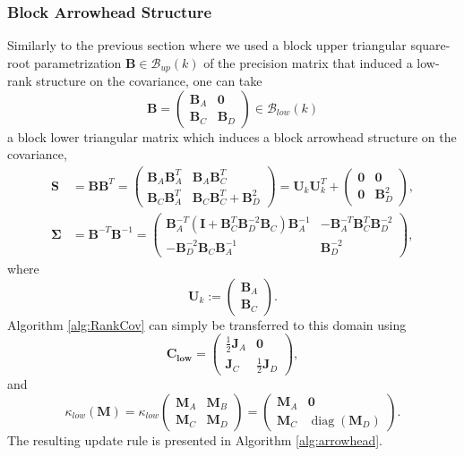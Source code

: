 \documentclass[a4paper, 11pt, oneside]{scrartcl}
\theoremstyle{break}
\DeclareMathOperator{\diag}{diag}
\newcommand{\matr}[1]{\boldsymbol{#1}}
\newcommand{\set}[1]{\mathcal{#1}}
\numberwithin{equation}{section}
\begin{document}
			\subsubsection{Block Arrowhead Structure}
				Similarly to the previous section where we used a block upper triangular square-root parametrization $\matr{B} \in \set{B}_{up}(k)$ of the precision matrix that induced a low-rank structure on the covariance, one can take 
				$$\matr{B} = \begin{pmatrix} \matr{B}_A & \matr{0} \\ \matr{B}_C & \matr{B}_D \end{pmatrix} \in \set{B}_{low}(k)$$
				a block lower triangular matrix which induces a block arrowhead structure on the covariance,
				\begin{align*}
					\matr{S} &= \matr{B} \matr{B}^T = \begin{pmatrix} \matr{B}_A \matr{B}_A^T & \matr{B}_A \matr{B}_C^T \\ \matr{B}_C \matr{B}_A^T & \matr{B}_C \matr{B}_C^T + \matr{B}_D^2 \end{pmatrix} = \matr{U}_k \matr{U}_k^T + \begin{pmatrix} \matr{0} & \matr{0} \\ \matr{0} & \matr{B}_D^2 \end{pmatrix}, \\
					\matr{\Sigma} &= \matr{B}^{-T} \matr{B}^{-1} = \begin{pmatrix} \matr{B}_A^{-T} (\matr{I} + \matr{B}_C^T \matr{B}_D^{-2} \matr{B}_C) \matr{B}_A^{-1} & -\matr{B}_A^{-T} \matr{B}_C^T \matr{B}_D^{-2} \\ -\matr{B}_D^{-2} \matr{B}_C \matr{B}_A^{-1} & \matr{B}_D^{-2} \end{pmatrix},
				\end{align*}
				where
				\begin{equation*}
					\matr{U}_k := \begin{pmatrix} \matr{B}_A \\ \matr{B}_C \end{pmatrix}.
				\end{equation*}
				Algorithm \ref{alg:RankCov} can simply be transferred to this domain using 
				\begin{equation}
					\matr{C_{low}} = \begin{pmatrix} \frac{1}{2} \matr{J}_A & \matr{0} \\ \matr{J}_C & \frac{1}{2} \matr{J}_D \end{pmatrix},
					\label{eqn:C_low}
				\end{equation}
				and
				\begin{equation}
					\kappa_{low}(\matr{M}) = \kappa_{low} \begin{pmatrix} \matr{M}_A & \matr{M}_B \\ \matr{M}_C & \matr{M}_D \end{pmatrix} = \begin{pmatrix} \matr{M}_A & \matr{0} \\ \matr{M}_C & \diag(\matr{M}_D) \end{pmatrix}.
					\label{eqn:kappa_low}
				\end{equation}
				The resulting update rule is presented in Algorithm \ref{alg:arrowhead}.
\end{document}
